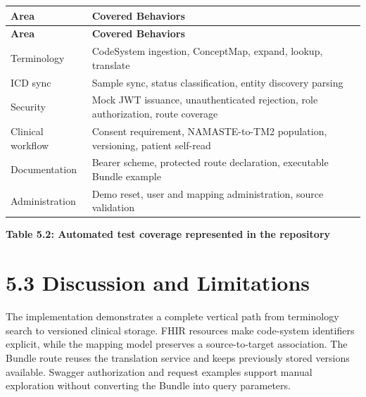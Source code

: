 \documentclass[12pt,a4paper,oneside]{report}
\begin{document}
\begin{longtable}{|p{}|p{}|}
\hline
\textbf{Area} & \textbf{Covered Behaviors} \\ \hline
\endfirsthead
\hline \textbf{Area} & \textbf{Covered Behaviors} \\ \hline\endhead
Terminology & CodeSystem ingestion, ConceptMap, expand, lookup, translate \\ \hline
ICD sync & Sample sync, status classification, entity discovery parsing \\ \hline
Security & Mock JWT issuance, unauthenticated rejection, role authorization, route coverage \\ \hline
Clinical workflow & Consent requirement, NAMASTE-to-TM2 population, versioning, patient self-read \\ \hline
Documentation & Bearer scheme, protected route declaration, executable Bundle example \\ \hline
Administration & Demo reset, user and mapping administration, source validation \\ \hline
\end{longtable}
\vspace{4pt}
\smallskip\textbf{\textbf{Table 5.2: Automated test coverage represented in the repository}}\
\section*{5.3 Discussion and Limitations}
The implementation demonstrates a complete vertical path from terminology search to versioned clinical storage. FHIR resources make code-system identifiers explicit, while the mapping model preserves a source-to-target association. The Bundle route reuses the translation service and keeps previously stored versions available. Swagger authorization and request examples support manual exploration without converting the Bundle into query parameters.
\end{document}
